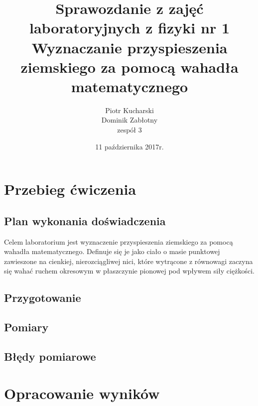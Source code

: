 \documentclass[a4paper,12pts]{report}
\begin{document}
	\title{\textbf{Sprawozdanie z zajęć laboratoryjnych z fizyki nr 1} \\ \large Wyznaczanie przyspieszenia ziemskiego za pomocą wahadła matematycznego}
	\date{11 października 2017r.}
	\author{Piotr Kucharski \\ Dominik Zabłotny \\ zespół 3}
	\maketitle
		
	
	\section{Przebieg ćwiczenia}
	\subsection{Plan wykonania doświadczenia}
	Celem laboratorium jest wyznaczenie przyspieszenia ziemskiego za pomocą wahadła matematycznego. Definuje się je jako ciało o masie punktowej zawieszone na cienkiej, nierozciągliwej nici, które wytrącone z równowagi zaczyna się wahać ruchem okresowym w płaszczynie pionowej pod wpływem siły ciężkości.
		
	\subsection{Przygotowanie}
	
	\subsection{Pomiary}
		
	\subsection{Błędy pomiarowe}
	
	\section{Opracowanie wyników}
	
\end{document}
